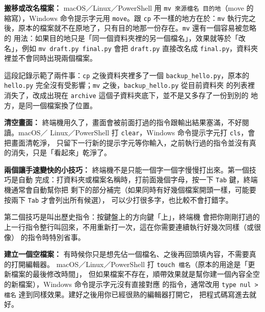 \textbf{搬移或改名檔案：} macOS／Linux／PowerShell 用 \texttt{mv 來源檔名 目的地}（move 的
縮寫），Windows 命令提示字元用 \texttt{move}。跟 \texttt{cp} 不一樣的地方在於：\texttt{mv}
執行完之後，原本的檔案就不在原地了，只有目的地那一份存在。\texttt{mv} 還有一個容易被忽略的
用法：如果目的地只是「同一個資料夾裡的另一個檔名」，效果就等於「改名」，例如
\texttt{mv draft.py final.py} 會把 \texttt{draft.py} 直接改名成 \texttt{final.py}，資料夾
裡並不會同時出現兩個檔案。



這段記錄示範了兩件事：\texttt{cp} 之後資料夾裡多了一個 \texttt{backup\_hello.py}，原本的
\texttt{hello.py} 完全沒有受影響；\texttt{mv} 之後，\texttt{backup\_hello.py} 從目前資料夾
的列表裡消失了，改成出現在 \texttt{archive} 這個子資料夾底下，並不是又多存了一份到別的
地方，是同一個檔案換了位置。

\textbf{清空畫面：} 終端機用久了，畫面會被前面打過的指令跟輸出結果塞滿，不好閱讀。macOS／
Linux／PowerShell 打 \texttt{clear}，Windows 命令提示字元打 \texttt{cls}，會把畫面清乾淨，
只留下一行新的提示字元等你輸入，之前執行過的指令並沒有真的消失，只是「看起來」乾淨了。

\textbf{兩個讓手速變快的小技巧：} 終端機不是只能一個字一個字慢慢打出來。第一個技巧是自動
完成：打資料夾或檔案名稱時，打前面幾個字母，按一下 \texttt{Tab} 鍵，終端機通常會自動幫你把
剩下的部分補完（如果同時有好幾個檔案開頭一樣，可能要按兩下 \texttt{Tab} 才會列出所有候選），
可以少打很多字，也比較不會打錯字。

第二個技巧是叫出歷史指令：按鍵盤上的方向鍵「上」，終端機
會把你剛剛打過的上一行指令整行叫回來，不用重新打一次，這在你需要連續執行好幾次同樣（或很像）
的指令時特別省事。

\textbf{建立一個空檔案：} 有時候你只是想先佔一個檔名、之後再回頭填內容，不需要真的打開編輯器。
macOS／Linux／PowerShell 打 \texttt{touch 檔名}（原本的用途是「更新檔案的最後修改時間」，
但如果檔案不存在，順帶效果就是幫你建一個內容全空的新檔案），Windows 命令提示字元沒有直接對應
的指令，通常改用 \texttt{type nul > 檔名} 達到同樣效果。建好之後用你已經很熟的編輯器打開它，
把程式碼寫進去就好。

